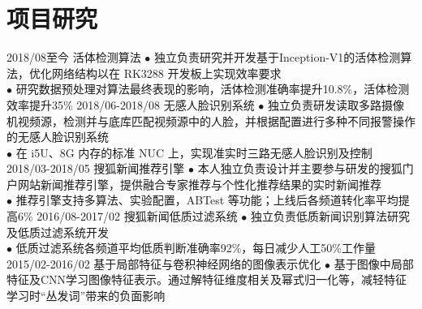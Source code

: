 \documentclass[a4paper,10pt]{professional-cv-cn}
\begin{document}
\section{项目研究}

\begin{entrylist}
  \entry
    {2018/08至今}
    {活体检测算法}
    {}
    {$\bullet$ 独立负责研究并开发基于Inception-V1的活体检测算法，优化网络结构以在 RK3288 开发板上实现效率要求\\
    $\bullet$ 研究数据预处理对算法最终表现的影响，活体检测准确率提升10.8\%，活体检测效率提升35\%}
  \entry
    {2018/06-2018/08}
    {无感人脸识别系统}
    {}
    {$\bullet$ 独立负责研发读取多路摄像机视频源，检测并与底库匹配视频源中的人脸，并根据配置进行多种不同报警操作的无感人脸识别系统\\
    $\bullet$ 在 i5U、8G 内存的标准 NUC 上，实现准实时三路无感人脸识别及控制}
  \entry
    {2018/03-2018/05}
    {搜狐新闻推荐引擎}
    {}
    {$\bullet$ 本人独立负责设计并主要参与研发的搜狐门户网站新闻推荐引擎，提供融合专家推荐与个性化推荐结果的实时新闻推荐 \\
    $\bullet$ 推荐引擎支持多算法、实验配置，ABTest 等功能；上线后各频道转化率平均提高6\%}
  \entry
    {2016/08-2017/02}
    {搜狐新闻低质过滤系统}
    {}
    {$\bullet$ 独立负责低质新闻识别算法研究及低质过滤系统开发\\
    $\bullet$ 低质过滤系统各频道平均低质判断准确率92\%，每日减少人工50\%工作量}
  \entry
    {2015/02-2016/02}
    {基于局部特征与卷积神经网络的图像表示优化}
    {}
    {$\bullet$ 基于图像中局部特征及CNN学习图像特征表示。通过解特征维度相关及幂式归一化等，减轻特征学习时“丛发词”带来的负面影响}
\end{entrylist}
\end{document}
